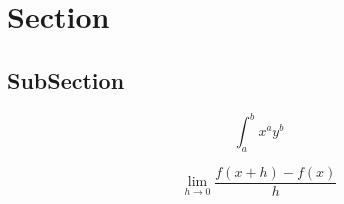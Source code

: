 \documentclass[a4paper]{article}
\begin{document}
\section{Section}

\subsection{SubSection}

\[ \int_{a}^{b}{x^{a}y^{b}} \]

\[\lim_{h \rightarrow 0 } \frac{f(x+h)-f(x)}{h}\]
\end{document}
